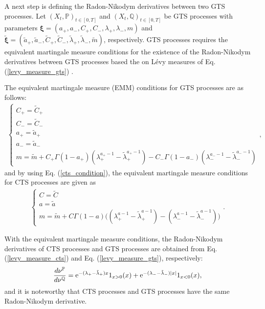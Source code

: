 \documentclass[preprint,11pt]{amsart}
\begin{document}
	 A next step is defining the Radon-Nikodym derivatives between two GTS processes. Let $(X_t, \mathbb{P})_{t\in[0,T]}$ and $(X_t, \mathbb{Q})_{t\in[0,T]}$ be GTS processes with parameters $\boldsymbol{\xi}=(a_+, a_-, C_+, C_-, \lambda_+, \lambda_-, m)$ and $\tilde{\boldsymbol{\xi}}=(\tilde{a}_+, \tilde{a}_-, \tilde{C}_+,\tilde{C}_-, \tilde{\lambda}_{+}, \tilde{\lambda}_{-}, \tilde{m})$, respectively. GTS processes requires the equivalent martingale measure conditions for the existence of the Radon-Nikodym derivatives between GTS processes based the on L\'evy measures of Eq. (\ref{levy_measure_gts}) \cite{kim2007relative}.
	
	The equivalent martingale measure (EMM) conditions for GTS processes \cite{rachev2011financial} are as follows:
	\begin{align}
	\label{emm_gts}
	\left\{ 
		\begin{array}{ll}
			C_+=\tilde{C}_+\\
			C_-=\tilde{C}_-\\
			a_+=\tilde{a}_+\\
			a_-=\tilde{a}_-\\
			m=\tilde{m}+C_+\Gamma(1-a_+)(\lambda_+^{a_+-1}-\tilde{\lambda}_{+}^{a_+-1})-C_-\Gamma(1-a_-)(\lambda_-^{a_--1}-\tilde{\lambda}_{-}^{a_--1})
		\end{array}
		\right.,
	\end{align}
	and by using Eq. (\ref{cts_condition}), the equivalent martingale measure conditions for CTS processes \cite{rachev2011financial} are given as
	\begin{align}
	\label{emm_cts}
	\left\{ 
		\begin{array}{ll}
			C=\tilde{C}\\ 
			a=\tilde{a}\\
			m=\tilde{m}+C\Gamma(1-a)\big((\lambda_+^{a-1}-\tilde{\lambda}_{+}^{a-1})-(\lambda_-^{a-1}-\tilde{\lambda}_{-}^{a-1})\big)
		\end{array}
		\right..
	\end{align}
	
	With the equivalent martingale measure conditions, the Radon-Nikodym derivatives of CTS processes and GTS processes \cite{rachev2011financial} are obtained from Eq. (\ref{levy_measure_cts}) and Eq. (\ref{levy_measure_gts}), respectively:
	\begin{align}
	\label{radon_nikodym_gts}
		\frac{d\nu^\mathbb{P}}{d\nu^\mathbb{Q}}={\rm e}^{-(\lambda_+-\tilde{\lambda}_+)x} 1_{x>0}(x)+{\rm e}^{-(\lambda_{-}-\tilde{\lambda}_{-})|x|} 1_{x<0}(x),
	\end{align}
	and it is noteworthy that CTS processes and GTS processes have the same Radon-Nikodym derivative.
	
\end{document}
